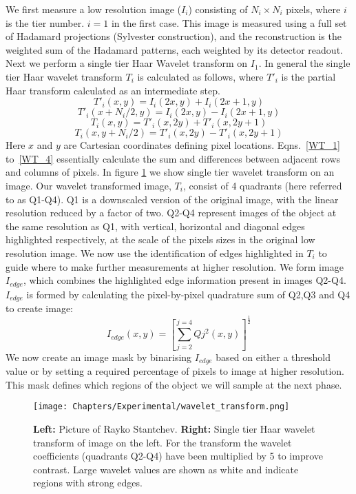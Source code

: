 We first measure a low resolution image ($I_i$) consisting of $N_i\times N_i$ pixels, where $i$ is the tier number. $i=1$ in the first case. This image is measured using a full set of Hadamard projections (Sylvester construction), and the reconstruction is the weighted sum of the Hadamard patterns, each weighted by its detector readout. Next we perform a single tier Haar Wavelet transform on $I_1$. In general the single tier Haar wavelet transform $T_i$ is calculated as follows, where $T'_i$ is the partial Haar transform calculated as an intermediate step.
\begin{equation}\label{WT_1}
T'_i(x,y) = I_i(2x,y)+I_i(2x+1,y)
\end{equation}
\begin{equation}\label{WT_2}
T'_i(x+N_i/2,y) = I_i(2x,y)-I_i(2x+1,y)
\end{equation}
\begin{equation}\label{WT_3}
T_i(x,y) = T'_i(x,2y)+T'_i(x,2y+1)
\end{equation}
\begin{equation}\label{WT_4}
T_i(x,y+N_i/2) = T'_i(x,2y)-T'_i(x,2y+1)
\end{equation}
Here $x$ and $y$ are Cartesian coordinates defining pixel locations. Eqns.~\ref{WT_1} to~\ref{WT_4} essentially calculate the sum and differences between adjacent rows and columns of pixels. In figure \ref{fig:wavelet_T} we show single tier wavelet transform on an image. Our wavelet transformed image, $T_i$, consist of 4 quadrants (here referred to as Q1-Q4). Q1 is a downscaled version of the original image, with the linear resolution reduced by a factor of two. Q2-Q4 represent images of the object at the same resolution as Q1, with vertical, horizontal and diagonal edges highlighted respectively, at the scale of the pixels sizes in the original low resolution image. We now use the identification of edges highlighted in $T_i$ to guide where to make further measurements at higher resolution.
We form image $I_{edge}$, which combines the highlighted edge information present in images Q2-Q4. $I_{edge}$ is formed by calculating the pixel-by-pixel quadrature sum of Q2,Q3 and Q4 to create image:
\begin{equation}
I_{edge}(x,y) = \left[\sum_{j=2}^{j=4} Qj^2(x,y)\right]^{\frac{1}{2}}
\end{equation}
We now create an image mask by binarising $I_{edge}$ based on either a threshold value or by setting a required percentage of pixels to image at higher resolution. This mask defines which regions of the object we will sample at the next phase.
\begin{figure}[h]\centering
\texttt{[image: Chapters/Experimental/wavelet\_transform.png]}
\caption{ \textbf{Left:} Picture of Rayko Stantchev. \textbf{Right:} Single tier Haar wavelet transform of image on the left. For the transform the wavelet coefficients (quadrants Q2-Q4) have been multiplied by 5 to improve contrast. Large wavelet values are shown as white and indicate regions with strong edges.  \label{fig:wavelet_T}
}
\end{figure}


